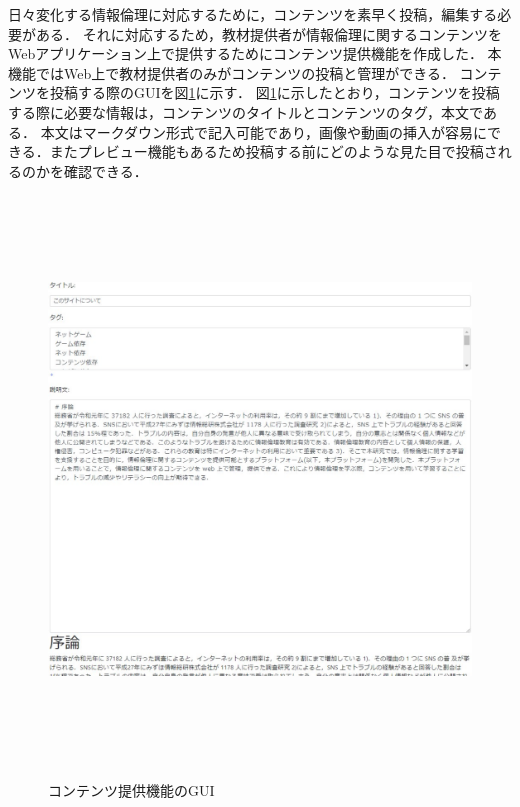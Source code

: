 日々変化する情報倫理に対応するために，コンテンツを素早く投稿，編集する必要がある．
それに対応するため，教材提供者が情報倫理に関するコンテンツをWebアプリケーション上で提供するためにコンテンツ提供機能を作成した．
本機能ではWeb上で教材提供者のみがコンテンツの投稿と管理ができる．
コンテンツを投稿する際のGUIを図\ref{content_teikyou}に示す．
図\ref{content_teikyou}に示したとおり，コンテンツを投稿する際に必要な情報は，コンテンツのタイトルとコンテンツのタグ，本文である．
本文はマークダウン形式で記入可能であり，画像や動画の挿入が容易にできる．またプレビュー機能もあるため投稿する前にどのような見た目で投稿されるのかを確認できる．

\begin{figure}[htbp]
    \begin{center}
        \includegraphics[width=16cm,height=15cm,keepaspectratio]{content_teikyou-crop.pdf}\\
    \end{center}
    \caption{コンテンツ提供機能のGUI}
    \label{content_teikyou}
\end{figure}

